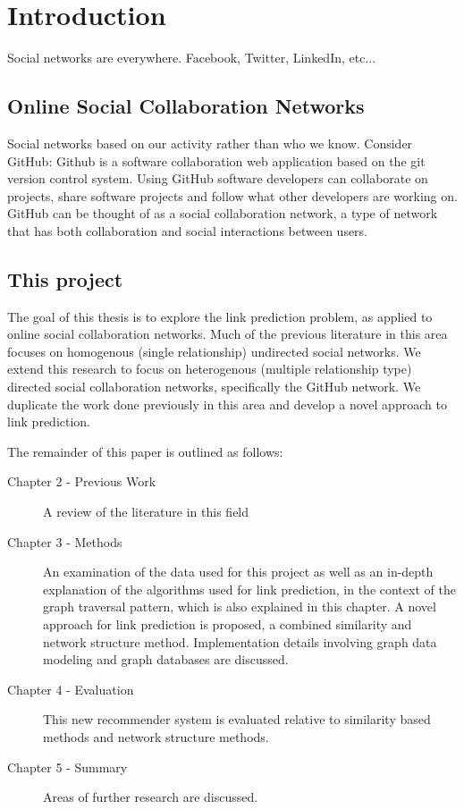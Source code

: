 
\chapter{Introduction}

Social networks are everywhere. Facebook, Twitter, LinkedIn, etc...

\section{Online Social Collaboration Networks}
Social networks based on our activity rather than who we know. Consider GitHub: Github is a software collaboration web application based on the git version control system. Using GitHub software developers can collaborate on projects, share software projects and follow what other developers are working on. GitHub can be thought of as a social collaboration network, a type of network that has both collaboration and social interactions between users. 



\section{This project}
The goal of this thesis is to explore the link prediction problem, as applied to online social collaboration networks. Much of the previous literature in this area focuses on homogenous (single relationship) undirected social networks. We extend this research to focus on heterogenous (multiple relationship type) directed social collaboration networks, specifically the GitHub network. We duplicate the work done previously in this area and develop a novel approach to link prediction.

The remainder of this paper is outlined as follows:

\begin{description}
\item[Chapter 2 - Previous Work ] A review of the literature in this field
\item[Chapter 3 - Methods]  An examination of the data used for this project as well as an in-depth explanation of the algorithms used for link prediction, in the context of the graph traversal pattern, which is also explained in this chapter. A novel approach for link prediction is proposed, a combined similarity and network structure method. Implementation details involving graph data modeling and graph databases are discussed.
\item[Chapter 4 - Evaluation] This new recommender system is evaluated relative to similarity based methods and network structure methods.
\item[Chapter 5 - Summary] Areas of further research are discussed.
\end{description}


